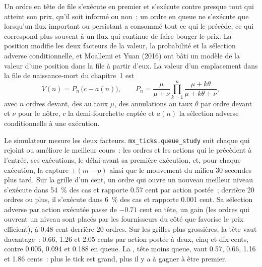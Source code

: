 Un ordre en tête de file s'exécute en premier et s'exécute contre presque tout  qui atteint son prix, qu'il soit informé ou non~; un ordre en queue
ne s'exécute que lorsqu'un flux important ou persistant a consommé tout ce qui le précède, ce qui correspond plus souvent à un flux qui continue de faire bouger le prix. La position modifie les deux
facteurs de la valeur, la probabilité et la sélection adverse conditionnelle, et Moallemi et Yuan (2016) ont bâti un modèle de la valeur d'une position dans la file
à partir d'eux. La valeur d'un emplacement dans la file de naissance-mort du chapitre~1 est
\[
V(n)=P_n\,\bigl(c-a(n)\bigr),\qquad P_n=\frac{\mu}{\mu+\nu}\prod_{k=1}^{n}\frac{\mu+k\theta}{\mu+k\theta+\nu},
\]
avec $n$ ordres devant, des  au taux $\mu$, des annulations au taux $\theta$ par ordre devant et $\nu$ pour le nôtre, $c$ la demi-fourchette captée
et $a(n)$ la sélection adverse conditionnelle à une exécution.

Le simulateur mesure les deux facteurs. \texttt{mx\_ticks.queue\_study} suit chaque  qui rejoint ou améliore le meilleur cours~: les ordres et les actions qui le précèdent
à l'entrée, ses exécutions, le délai avant sa première exécution, et, pour chaque exécution, la capture $\pm(m-p)$ ainsi que le mouvement du milieu 30 secondes plus tard. Sur la grille d'un cent,
un ordre qui ouvre un nouveau meilleur niveau s'exécute dans 54~\% des cas et rapporte 0.57 cent par action postée~; derrière 20 ordres ou plus, il s'exécute dans 6~\% des cas et
rapporte 0.001 cent. Sa sélection adverse par action exécutée passe de $-0.71$ cent en tête, un gain (les ordres qui ouvrent un niveau sont placés par les fournisseurs du côté
que favorise le prix efficient), à 0.48 cent derrière 20 ordres. Sur les grilles plus grossières, la tête vaut davantage~: 0.66, 1.26 et 2.05 cents par action postée à
deux, cinq et dix cents, contre 0.005, 0.094 et 0.188 en queue. La , tête moins queue, vaut 0.57, 0.66, 1.16 et 1.86 cents~:
plus le tick est grand, plus il y a à gagner à être premier.

